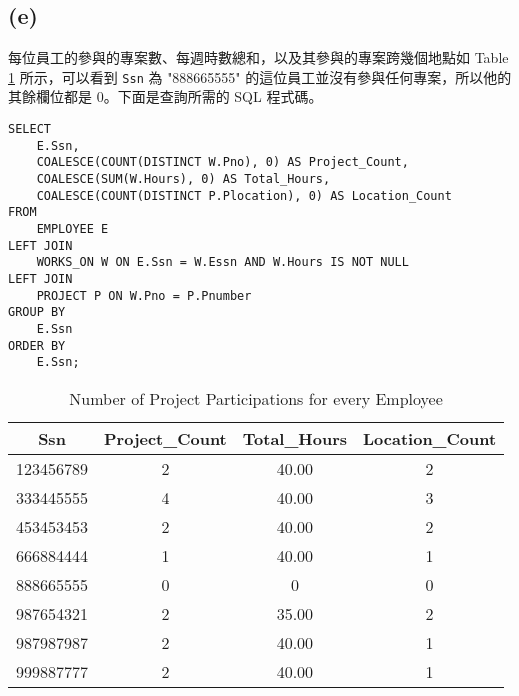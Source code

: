 \documentclass{article}
\begin{document}
\subsection*{(e)}
每位員工的參與的專案數、每週時數總和，以及其參與的專案跨幾個地點如 Table \ref{table:1_e} 所示，可以看到 \texttt{Ssn} 為 "888665555" 的這位員工並沒有參與任何專案，所以他的其餘欄位都是 0。下面是查詢所需的 SQL 程式碼。
\begin{verbatim}
SELECT 
    E.Ssn,
    COALESCE(COUNT(DISTINCT W.Pno), 0) AS Project_Count,  
    COALESCE(SUM(W.Hours), 0) AS Total_Hours,              
    COALESCE(COUNT(DISTINCT P.Plocation), 0) AS Location_Count  
FROM 
    EMPLOYEE E
LEFT JOIN 
    WORKS_ON W ON E.Ssn = W.Essn AND W.Hours IS NOT NULL  
LEFT JOIN 
    PROJECT P ON W.Pno = P.Pnumber
GROUP BY 
    E.Ssn  
ORDER BY 
    E.Ssn;  
\end{verbatim}
\begin{table}[H]
\centering
\begin{tabular}{cccc}
\toprule
Ssn & Project\_Count & Total\_Hours & Location\_Count \\
\midrule
123456789 & 2 & 40.00 & 2 \\
333445555 & 4 & 40.00 & 3 \\
453453453 & 2 & 40.00 & 2 \\
666884444 & 1 & 40.00 & 1 \\
888665555 & 0 & 0 & 0 \\
987654321 & 2 & 35.00 & 2 \\
987987987 & 2 & 40.00 & 1 \\
999887777 & 2 & 40.00 & 1 \\
\bottomrule
\end{tabular}
\caption{Number of Project Participations for every Employee}
\label{table:1_e}
\end{table}
\end{document}
